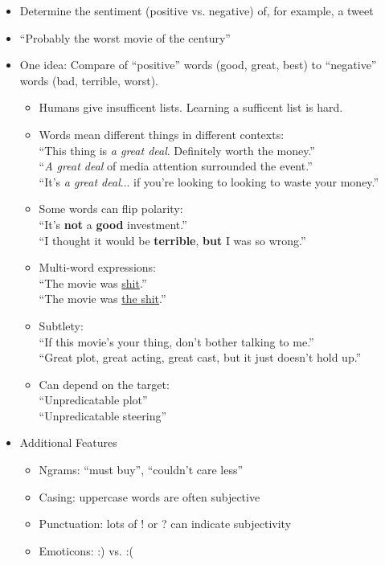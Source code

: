 \documentclass[11pt,letterpaper]{article}
\begin{document}
\begin{itemize}
  \item Determine the sentiment (positive vs. negative) of, for example, a tweet
  \item ``Probably the worst movie of the century''
  \item One idea: Compare of ``positive'' words (good, great, best) to ``negative'' words (bad, terrible, worst).
    \begin{itemize}
      \item Humans give insufficent lists.  Learning a sufficent list is hard.
      \item Words mean different things in different contexts: \\
            ``This thing is \textit{a great deal}.  Definitely worth the money.'' \\
            ``\textit{A great deal} of media attention surrounded the event.'' \\
            ``It's \textit{a great deal}... if you're looking to looking to waste your money.''
      \item Some words can flip polarity: \\
            ``It's \textbf{not} a \textbf{good} investment.'' \\
            ``I thought it would be \textbf{terrible}, \textbf{but} I was so wrong.''
      \item Multi-word expressions: \\
            ``The movie was \underline{shit}.'' \\
            ``The movie was \underline{the shit}.''
      \item Subtlety: \\
            ``If this movie's your thing, don't bother talking to me.'' \\
            ``Great plot, great acting, great cast, but it just doesn't hold up.''
      \item Can depend on the target: \\
            ``Unpredicatable plot''\\
            ``Unpredicatable steering''
    \end{itemize}
  \item Additional Features
    \begin{itemize}
      \item Ngrams: ``must buy'', ``couldn't care less''
      \item Casing: uppercase words are often subjective
      \item Punctuation: lots of ! or ? can indicate subjectivity
      \item Emoticons: :) vs. :(
    \end{itemize}
\end{itemize}
\end{document}
